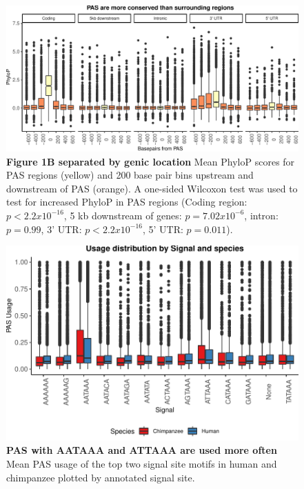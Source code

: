 \begin{figure}[!htb]
\centering
\includegraphics[width=5in]{img/ch03/Fig1-figSup7.pdf}
\caption[Figure 1B separated by genic location]{\textbf{Figure 1B separated by genic location} Mean PhyloP scores for PAS regions (yellow) and 200 base pair bins upstream and downstream of PAS (orange). A one-sided Wilcoxon test was used to test for increased PhyloP in PAS regions  (Coding region: $p < 2.2x10^{-16}$, 5 kb downstream of genes: $p = 7.02x10^{-6}$, intron: $p=0.99$, 3' UTR: $p < 2.2x10^{-16}$, 5' UTR: $p = 0.011$).}
\label{fig:ch03-phylopLoc}
\end{figure}
\clearpage

\begin{figure}[!htb]
\centering
\includegraphics[width=5in]{img/ch03/Fig1-figSup8.pdf}
\caption[PAS with AATAAA and ATTAAA are used more often]{\textbf{PAS with AATAAA and ATTAAA are used more often} Mean PAS usage of the top two signal site motifs in human and chimpanzee plotted by annotated signal site.}
\label{fig:ch03-SignalUsage}
\end{figure}
\clearpage

